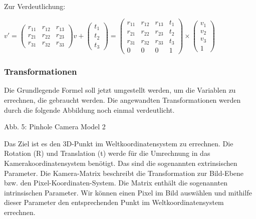 		Zur Verdeutlichung:
		
		\( v' =  \begin{pmatrix}
		r_{11} & r_{12} & r_{13} \\ r_{21} & r_{22} & r_{23} \\ r_{31} & r_{32} & r_{33}
		\end{pmatrix} v + 
		\begin{pmatrix}
		t_1 \\ t_2 \\ t_3
		\end{pmatrix} = \begin{pmatrix}
		r_{11} & r_{12} & r_{13} & t_1 \\ r_{21} & r_{22} & r_{23} & t_2 \\ 
		r_{31} & r_{32} & r_{33} & t_3 \\ 0 & 0 & 0 & 1
		\end{pmatrix} \times
		\begin{pmatrix}
		v_1 \\ v_2 \\ v_3 \\ 1
		\end{pmatrix} \)
		
		\subsubsection{Transformationen}
		Die Grundlegende Formel soll jetzt umgestellt werden, um die Variablen zu errechnen, die gebraucht werden. Die angewandten Transformationen werden durch die folgende Abbildung noch einmal verdeutlicht.
		
		Abb. 5: Pinhole Camera Model 2
		
		Das Ziel ist es den 3D-Punkt im Weltkoordinatensystem zu errechnen. Die Rotation (R) und Translation (t) werde für die Umrechnung in das Kamerakoordinatensystem benötigt. Das sind die sogenannten extrinsischen Parameter. Die Kamera-Matrix beschreibt die Transformation zur Bild-Ebene bzw. den Pixel-Koordinaten-System. Die Matrix enthält die sogenannten intrinsischen Parameter. Wir können einen Pixel im Bild auswählen und mithilfe dieser Parameter den entsprechenden Punkt im Weltkoordinatensystem errechnen.
		

